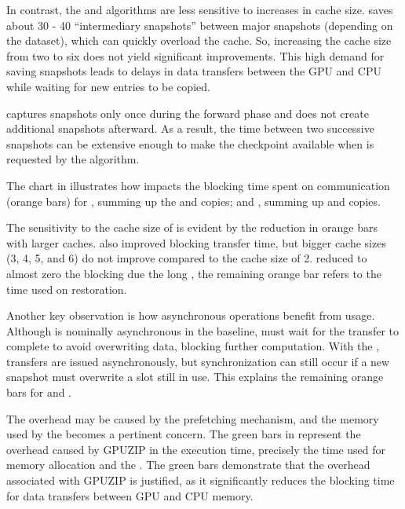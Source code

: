 \documentclass[Ingles]{ic-tese-v3}
\begin{document}
In contrast, the \zcut and \uniform algorithms are less sensitive to increases in cache size. \zcut saves about 30 - 40 ``intermediary snapshots'' between major snapshots (depending on the dataset), which can quickly overload the cache. So, increasing the cache size from two to six does not yield significant improvements. This high demand for saving snapshots leads to delays in data transfers between the GPU and CPU while waiting for new entries to be copied.

\uniform captures snapshots only once during the forward phase and does not create additional snapshots afterward. As a result, the time between two successive snapshots can be extensive enough to make the checkpoint available when \restore is requested by the \checkpointing algorithm.

The chart in  illustrates how \checkpointprefetching impacts the blocking time spent on communication (orange bars) for \save, summing up the \dth and \dtd copies; and \restore, summing up \htd and \dtd copies. 

The sensitivity to the cache size of \revolve is evident by the reduction in orange bars with larger caches. \zcut also improved blocking transfer time, but bigger cache sizes (3, 4, 5, and 6) do not improve compared to the cache size of 2. \uniform reduced to almost zero the blocking \restore due the long , the remaining orange bar refers to the \dtd time used on restoration.

Another key observation is how asynchronous \save operations benefit from \cache usage. Although \save is nominally asynchronous in the baseline, \awave must wait for the transfer to complete to avoid overwriting data, blocking further computation. With the \cache, \dth transfers are issued asynchronously, but synchronization can still occur if a new snapshot must overwrite a slot still in use. This explains the remaining \save orange bars for \revolve and \zcut.

The overhead may be caused by the prefetching mechanism, and the memory used by the \cache becomes a pertinent concern. The green bars in  represent the overhead caused by GPUZIP in the execution time, precisely the time used for memory allocation and the \psa. The green bars demonstrate that the overhead associated with GPUZIP is justified, as it significantly reduces the blocking time for data transfers between GPU and CPU memory. 
\end{document}
